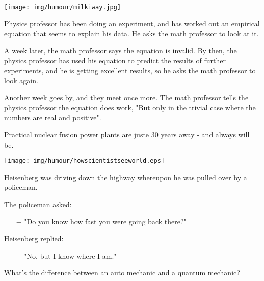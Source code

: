 	\begin{center}
	\texttt{[image: img/humour/milkiway.jpg]}
	\end{center}
\begin{center}\underline{\hspace{5 cm}}\end{center}

Physics professor has been doing an experiment, and has worked out an empirical equation that seems to explain his data. He asks the math professor to look at it. 

A week later, the math professor says the equation is invalid. By then, the physics professor has used his equation to predict the results of further experiments, and he is getting excellent results, so he asks the math professor to look again. 

Another week goes by, and they meet once more. The math professor tells the physics professor the equation does work, "But only in the trivial case where the numbers are real and positive".
\begin{center}\underline{\hspace{5 cm}}\end{center}

Practical nuclear fusion power plants are juste 30 years away - and always will be.
	
	\pagebreak
	\begin{center}
	\texttt{[image: img/humour/howscientistseeworld.eps]}
	\end{center}
	
	\pagebreak
	
	Heisenberg was driving down the highway whereupon he was pulled over by a policeman. 

	The policeman asked:
	
	\begin{itemize}	 
		\item[$-$] "Do you know how fast you were going back there?"
	\end{itemize}
	
	Heisenberg replied: 
	
	\begin{itemize}	 
		\item[$-$] "No, but I know where I am."
	\end{itemize}
	\begin{center}\underline{\hspace{5 cm}}\end{center}
	
	What's the difference between an auto mechanic and a quantum mechanic?
	
